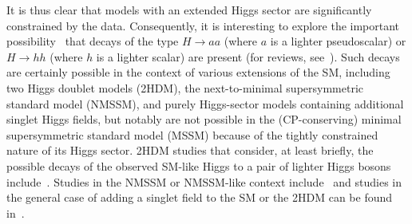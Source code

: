 It is thus clear that models with an extended Higgs sector are significantly constrained by the data.  Consequently, it is interesting to explore the important possibility~\cite{Dermisek:2005ar,Dermisek:2006wr} that decays of the type $H$$\rightarrow$$aa$ (where $a$ is a lighter pseudoscalar) or $H$$\rightarrow$$hh$ (where $h$ is a lighter scalar) are present (for reviews, see~\cite{Chang:2008cw,Curtin:2013fra}). Such decays are certainly possible in the context of various extensions of the SM, including two Higgs doublet models (2HDM), the next-to-minimal supersymmetric standard model (NMSSM), and purely Higgs-sector models containing additional singlet Higgs fields, but notably are not possible in the (CP-conserving) minimal supersymmetric standard model (MSSM) because of the tightly constrained nature of its Higgs sector. 2HDM studies that consider, at least briefly, the possible decays of the observed SM-like Higgs to a pair of lighter Higgs bosons include~\cite{Belanger:2013kya,Bernon:2014nxa,Curtin:2013fra,Celis:2013rcs,Grinstein:2013npa,Coleppa:2013dya,Chen:2013rba,Craig:2013hca,Wang:2013sha,Baglio:2014nea}. Studies in the NMSSM or NMSSM-like context include~\cite{Curtin:2013fra,King:2012tr,Cao:2013gba,Christensen:2013dra,Cerdeno:2013cz} and studies in the general case of adding a singlet field to the SM or the 2HDM can be found in~\cite{Curtin:2013fra,Chalons:2012qe,Ahriche:2013vqa}.

